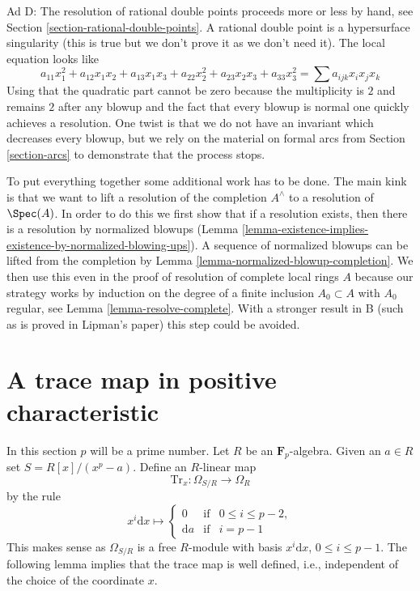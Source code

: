 \medskip\noindent
Ad D: The resolution of rational double points proceeds more or
less by hand, see
Section \ref{section-rational-double-points}.
A rational double point
is a hypersurface singularity (this is true but we don't prove it
as we don't need it). The local equation looks like
$$
a_{11} x_1^2 + a_{12} x_1x_2 + a_{13}x_1x_3 + a_{22} x_2^2 +
a_{23} x_2x_3 + a_{33} x_3^2 =
\sum a_{ijk} x_ix_jx_k
$$
Using that the quadratic part cannot be zero because the multiplicity
is $2$ and remains $2$ after any blowup and the fact that every blowup
is normal one quickly achieves a resolution. One twist is that we
do not have an invariant which decreases every blowup, but we rely
on the material on formal arcs from Section \ref{section-arcs}
to demonstrate that the process stops.

\medskip\noindent
To put everything together some additional work has
to be done. The main kink is that we want to lift a resolution
of the completion $A^\wedge$ to a resolution of $\Spec(A)$.
In order to do this we first show that if a resolution exists,
then there is a resolution by normalized blowups
(Lemma \ref{lemma-existence-implies-existence-by-normalized-blowing-ups}).
A sequence of normalized blowups can be lifted from the completion
by Lemma \ref{lemma-normalized-blowup-completion}.
We then use this even in the proof of resolution of complete
local rings $A$ because our strategy works by induction
on the degree of a finite inclusion $A_0 \subset A$ with
$A_0$ regular, see Lemma \ref{lemma-resolve-complete}.
With a stronger result in B (such as is proved in Lipman's paper)
this step could be avoided.




\section{A trace map in positive characteristic}
\label{section-trace}

\noindent
In this section $p$ will be a prime number. Let $R$ be an
$\mathbf{F}_p$-algebra. Given an $a \in R$ set $S = R[x]/(x^p - a)$.
Define an $R$-linear map
$$
\text{Tr}_x : \Omega_{S/R} \longrightarrow \Omega_R
$$
by the rule
$$
x^i\text{d}x \longmapsto
\left\{
\begin{matrix}
0 & \text{if} & 0 \leq i \leq p - 2, \\
\text{d}a & \text{if} & i = p - 1
\end{matrix}
\right.
$$
This makes sense as $\Omega_{S/R}$ is a free $R$-module with
basis $x^i\text{d}x$, $0 \leq i \leq p - 1$.
The following lemma implies that the trace map is well defined,
i.e., independent of the choice of the coordinate $x$.

